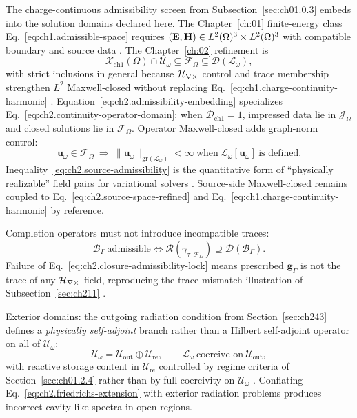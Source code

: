 The charge-continuous admissibility screen from Subsection~\ref{sec:ch01.0.3} embeds into the solution domains declared here. The Chapter~\ref{ch:01} finite-energy class Eq.~\eqref{eq:ch1.admissible-space} requires \((\mathbf{E},\mathbf{H})\in L^{2}(\Omega)^{3}\times L^{2}(\Omega)^{3}\) with compatible boundary and source data \cite{stratton1941}.
The Chapter~\ref{ch:02} refinement is
\begin{equation}
\label{eq:ch2.admissibility-embedding}
\mathcal{X}_{\mathrm{ch1}}(\Omega)\cap\mathcal{U}_\omega
\subseteq
\mathcal{F}_\Omega
\subseteq
\mathcal{D}(\mathcal{L}_\omega),
\end{equation}
with strict inclusions in general because \(\mathcal{H}_{\nabla\times}\) control and trace membership strengthen \(L^{2}\) Maxwell-closed without replacing Eq.~\eqref{eq:ch1.charge-continuity-harmonic} \cite{stratton1941}. Equation~\eqref{eq:ch2.admissibility-embedding} specializes Eq.~\eqref{eq:ch2.continuity-operator-domain}: when \(\mathcal{D}_{\mathrm{ch1}}=1\), impressed data lie in \(\mathcal{J}_\Omega\) and closed solutions lie in \(\mathcal{F}_\Omega\). Operator Maxwell-closed adds graph-norm control:
\begin{equation}
\label{eq:ch2.graph-charge-continuous-criterion}
\mathbf{u}_\omega\in\mathcal{F}_\Omega
\ \Longrightarrow\
\|\mathbf{u}_\omega\|_{\mathrm{gr}(\mathcal{L}_\omega)}<\infty
\ \text{when}\ \mathcal{L}_\omega[\mathbf{u}_\omega]\ \text{is defined}.
\end{equation}
Inequality~\eqref{eq:ch2.source-admissibility} is the quantitative form of ``physically realizable'' field pairs for variational solvers \cite{harrington2001}. Source-side Maxwell-closed remains coupled to Eq.~\eqref{eq:ch2.source-space-refined} and Eq.~\eqref{eq:ch1.charge-continuity-harmonic} by reference.

Completion operators must not introduce incompatible traces:
\begin{equation}
\label{eq:ch2.closure-admissibility-lock}
\mathcal{B}_\Gamma\ \text{admissible}
\iff
\mathcal{R}(\gamma_\tau|_{\mathcal{F}_\Omega})\supseteq
\mathcal{D}(\mathcal{B}_\Gamma).
\end{equation}
Failure of Eq.~\eqref{eq:ch2.closure-admissibility-lock} means prescribed \(\mathbf{g}_\Gamma\) is not the trace of any \(\mathcal{H}_{\nabla\times}\) field, reproducing the trace-mismatch illustration of Subsection~\ref{sec:ch211} \cite{stratton1941}.

Exterior domains: the outgoing radiation condition from Section~\ref{sec:ch243} defines a \emph{physically self-adjoint} branch rather than a Hilbert self-adjoint operator on all of \(\mathcal{U}_\omega\):
\begin{equation}
\label{eq:ch2.outgoing-nonselfadjoint-split}
\mathcal{U}_\omega
=
\mathcal{U}_{\mathrm{out}}\oplus\mathcal{U}_{\mathrm{re}},
\qquad
\mathcal{L}_\omega\ \text{coercive on}\ \mathcal{U}_{\mathrm{out}},
\end{equation}
with reactive storage content in \(\mathcal{U}_{\mathrm{re}}\) controlled by regime criteria of Section~\ref{sec:ch01.2.4} rather than by full coercivity on \(\mathcal{U}_\omega\) \cite{stratton1941}. Conflating Eq.~\eqref{eq:ch2.friedrichs-extension} with exterior radiation problems produces incorrect cavity-like spectra in open regions.

